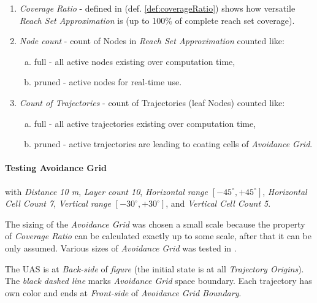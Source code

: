 \begin{enumerate}
    \item\emph{Coverage Ratio} - defined in (def. \ref{def:coverageRatio}) shows how versatile \emph{Reach Set Approximation} is (up to 100\% of complete reach set coverage). 
    
    \item\emph{Node count} - count of Nodes in \emph{Reach Set Approximation} counted like:
    \begin{enumerate}[a.]
        \item full -  all active nodes existing over computation time,
        \item pruned - active nodes for real-time use.
    \end{enumerate}
    
    \item\emph{Count of Trajectories} - count of Trajectories (leaf Nodes) counted like:
    \begin{enumerate}[a.]
        \item full -  all active trajectories existing over computation time,
        \item pruned - active trajectories are leading to coating cells of \emph{Avoidance Grid}.
    \end{enumerate}
\end{enumerate}


\paragraph{Testing Avoidance Grid}  with \emph{Distance 10 m}, \emph{Layer count 10}, \emph{Horizontal range $[-45^\circ,+45^\circ]$}, \emph{Horizontal Cell Count 7}, \emph{Vertical range $[-30^\circ,+30^\circ]$}, and \emph{Vertical Cell Count 5}. 

\begin{note}
    The sizing of the \emph{Avoidance Grid} was chosen a small scale because the property of \emph{Coverage Ratio} can be calculated exactly up to some scale, after that it can be only assumed. Various sizes of \emph{Avoidance Grid} was tested in \cite{gomola2017probabilistic}.
\end{note}

The UAS is at \emph{Back-side} of \emph{figure} (the initial state is at all \emph{Trajectory Origins}). The \emph{black dashed line} marks \emph{Avoidance Grid} space boundary. Each trajectory has own color and ends at \emph{Front-side} of \emph{Avoidance Grid Boundary}.

